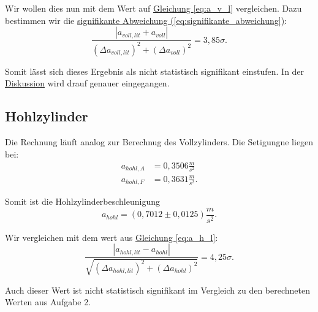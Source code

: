 Wir wollen dies nun mit dem Wert auf \hyperref[eq:a_v_l]{Gleichung \ref*{eq:a_v_l}} vergleichen. Dazu bestimmen wir die \hyperref[eq:signifikante_abweichung]{signifikante Abweichung (\ref*{eq:signifikante_abweichung})}:
\begin{equation}
    \frac{\left| a_{voll,lit} + a_{voll} \right|}{(\Delta a_{voll,lit})^2 + (\Delta a_{voll})^2} = 3,85\sigma.
\end{equation}

Somit lässt sich dieses Ergebnis als nicht statistisch signifikant einstufen. In der \hyperref[ch:diskussion]{Diskussion} wird drauf genauer eingegangen.

\subsection*{Hohlzylinder}
Die Rechnung läuft analog zur Berechnug des Vollzylinders. Die Setigungne liegen bei:
\begin{align}
    a_{hohl,A} &= 0,3506 \frac{m}{s^2} \\
    a_{hohl,F} &= 0,3631 \frac{m}{s^2}.
\end{align}

Somit ist die Hohlzylinderbeschleunigung
\begin{equation}
\boxed{
    a_{hohl} = (0,7012 \pm 0,0125) \frac{m}{s^2}
}.
\end{equation}

Wir vergleichen mit dem wert aus \hyperref[eq:a_h_l]{Gleichung \ref*{eq:a_h_l}}:
\begin{equation}
    \frac{\left| a_{hohl,lit} - a_{hohl} \right|}{\sqrt{(\Delta a_{hohl,lit})^2 + (\Delta a_{hohl})^2}} = 4,25\sigma.
\end{equation}

Auch dieser Wert ist nicht statistisch signifikant im Vergleich zu den berechneten Werten aus Aufgabe 2.


\onecolumn
